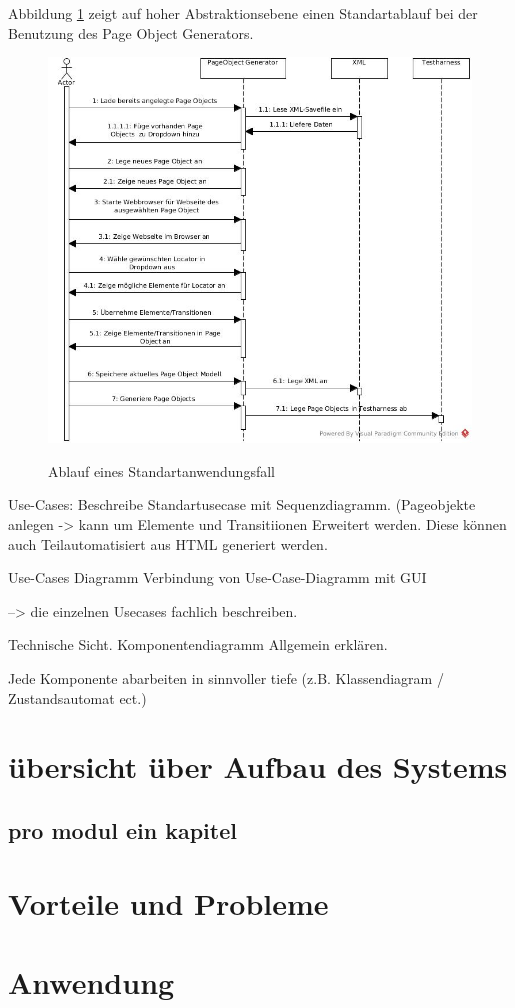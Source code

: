 Abbildung \ref{fig:sequenz} zeigt auf hoher Abstraktionsebene einen Standartablauf bei der Benutzung des Page Object Generators.

\begin{figure}[htb]
  \centering  
  \includegraphics[scale=0.5]{img/Sequenzdiagramm.jpg}\\
  \caption{Ablauf eines Standartanwendungsfall}
  \label{fig:sequenz}
\end{figure}

\newpage


Use-Cases: Beschreibe Standartusecase mit Sequenzdiagramm. (Pageobjekte anlegen -> kann um Elemente und Transitiionen Erweitert werden. Diese können auch Teilautomatisiert aus HTML generiert werden.

Use-Cases Diagramm 
Verbindung von Use-Case-Diagramm mit GUI

--> die einzelnen Usecases fachlich beschreiben.

Technische Sicht. 
Komponentendiagramm Allgemein erklären.

Jede Komponente abarbeiten in sinnvoller tiefe (z.B. Klassendiagram / Zustandsautomat ect.)









\section{übersicht über Aufbau des Systems}

\subsection{pro modul ein kapitel}

\section{Vorteile und Probleme}

\section{Anwendung}
